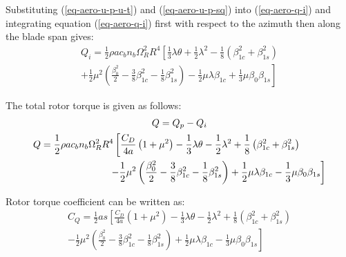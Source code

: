 Substituting (\ref{eq-aero-u-p-u-t}) and (\ref{eq-aero-u-p-sq}) into (\ref{eq-aero-q-i}) and integrating equation (\ref{eq-aero-q-i}) first with respect to the azimuth then along the blade span gives:
\begin{multline}
Q_i = \frac{1}{2} \rho a c_b n_b \Omega_R^2 R^4
\left[
    \frac{1}{3} \lambda \theta
  + \frac{1}{2} \lambda^2
  - \frac{1}{8} \left( \beta_{1c}^2 + \beta_{1s}^2 \right)
  \right.
  \\
  \left.
  + \frac{1}{2} \mu^2
  \left(
    \frac{\beta_0^2}{2}
    - \frac{3}{8} \beta_{1c}^2
    - \frac{1}{8} \beta_{1s}^2
  \right)
  - \frac{1}{2} \mu \lambda \beta_{1c}
  + \frac{1}{3} \mu \beta_0 \beta_{1s}
\right]
\end{multline}

The total rotor torque is given as follows: \cite{Bramwell2001, NASA-TT-F-494}
\begin{gather}
  Q = Q_p - Q_i \\
  \begin{multlined}[0.88\textwidth]
    Q = \frac{1}{2} \rho a c_b n_b \Omega_R^2 R^4
    \left[
      \frac{C_D}{4a} \left( 1 + \mu^2 \right)
      - \frac{1}{3} \lambda \theta
      - \frac{1}{2} \lambda^2
      + \frac{1}{8} \left( \beta_{1c}^2 + \beta_{1s}^2 \right)
      \right.
      \\
      \left.
      - \frac{1}{2} \mu^2
      \left(
        \frac{\beta_0^2}{2}
        - \frac{3}{8} \beta_{1c}^2
        - \frac{1}{8} \beta_{1s}^2
      \right)
      + \frac{1}{2} \mu \lambda \beta_{1c}
      - \frac{1}{3} \mu \beta_0 \beta_{1s}
    \right]
  \end{multlined}
\end{gather}

Rotor torque coefficient can be written as:
\begin{multline}
  C_Q = \frac{1}{2} a s
  \left[
    \frac{C_D}{4a} \left( 1 + \mu^2 \right)
    - \frac{1}{3} \lambda \theta
    - \frac{1}{2} \lambda^2
    + \frac{1}{8} \left( \beta_{1c}^2 + \beta_{1s}^2 \right)
    \right.
    \\
    \left.
    - \frac{1}{2} \mu^2
    \left(
      \frac{\beta_0^2}{2}
      - \frac{3}{8} \beta_{1c}^2
      - \frac{1}{8} \beta_{1s}^2
    \right)
    + \frac{1}{2} \mu \lambda \beta_{1c}
    - \frac{1}{3} \mu \beta_0 \beta_{1s}
  \right]
\end{multline}


